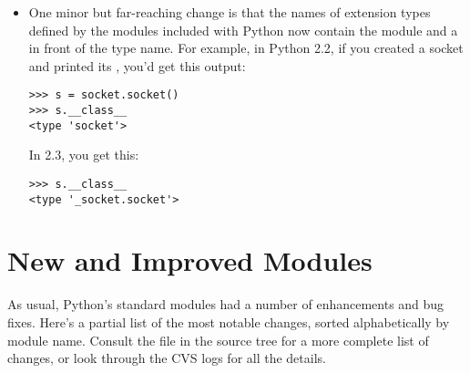 \documentclass{howto}
\begin{document}
\begin{itemize}
\item One minor but far-reaching change is that the names of extension
types defined by the modules included with Python now contain the
module and a  in front of the type name.  For example, in
Python 2.2, if you created a socket and printed its
, you'd get this output:

\begin{verbatim}
>>> s = socket.socket()
>>> s.__class__
<type 'socket'>
\end{verbatim}

In 2.3, you get this:
\begin{verbatim}
>>> s.__class__
<type '_socket.socket'>
\end{verbatim}

\end{itemize}


\section{New and Improved Modules}

As usual, Python's standard modules had a number of enhancements and
bug fixes.  Here's a partial list of the most notable changes, sorted
alphabetically by module name. Consult the
 file in the source tree for a more
complete list of changes, or look through the CVS logs for all the
details.
\end{document}
